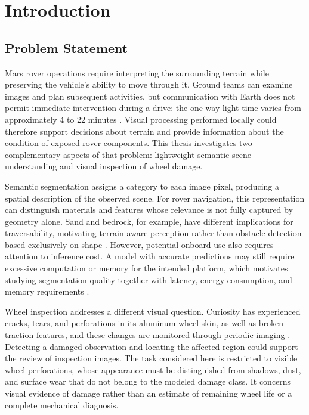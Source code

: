 \chapter{Introduction}

\section{Problem Statement}

Mars rover operations require interpreting the surrounding terrain while preserving the vehicle's ability to move through it. Ground teams can examine images and plan subsequent activities, but communication with Earth does not permit immediate intervention during a drive: the one-way light time varies from approximately 4 to 22 minutes \cite{nasaJPL2022Driving}. Visual processing performed locally could therefore support decisions about terrain and provide information about the condition of exposed rover components. This thesis investigates two complementary aspects of that problem: lightweight semantic scene understanding and visual inspection of wheel damage.

Semantic segmentation assigns a category to each image pixel, producing a spatial description of the observed scene. For rover navigation, this representation can distinguish materials and features whose relevance is not fully captured by geometry alone. Sand and bedrock, for example, have different implications for traversability, motivating terrain-aware perception rather than obstacle detection based exclusively on shape \cite{swan2021ai4mars}. However, potential onboard use also requires attention to inference cost. A model with accurate predictions may still require excessive computation or memory for the intended platform, which motivates studying segmentation quality together with latency, energy consumption, and memory requirements \cite{xiong2024light4mars}.

Wheel inspection addresses a different visual question. Curiosity has experienced cracks, tears, and perforations in its aluminum wheel skin, as well as broken traction features, and these changes are monitored through periodic imaging \cite{rankin2022wheelassessment}. Detecting a damaged observation and locating the affected region could support the review of inspection images. The task considered here is restricted to visible wheel perforations, whose appearance must be distinguished from shadows, dust, and surface wear that do not belong to the modeled damage class. It concerns visual evidence of damage rather than an estimate of remaining wheel life or a complete mechanical diagnosis.

